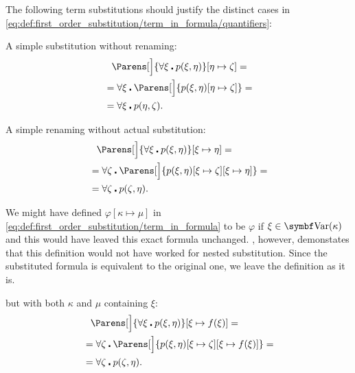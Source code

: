 \begin{example}\label{ex:first_order_substitution}
  The following term substitutions should justify the distinct cases in \eqref{eq:def:first_order_substitution/term_in_formula/quantifiers}:
  \begin{ExEnum}
     A simple substitution without renaming:
    \begin{align*}
      &{}\phantom{=}{}
      \Parens[\Big]{\forall \xi \centerdot p(\xi, \eta)}[\eta \mapsto \zeta]
      = \\ &=
      \forall \xi \centerdot \Parens[\Big]{p(\xi, \eta)[\eta \mapsto \zeta]}
      = \\ &=
      \forall \xi \centerdot p(\eta, \zeta).
    \end{align*}

     A simple renaming without actual substitution:
    \begin{align*}
      &{}\phantom{=}{}
      \Parens[\Big]{\forall \xi \centerdot p(\xi, \eta)}[\xi \mapsto \eta]
      = \\ &=
      \forall \zeta \centerdot \Parens[\Big]{p(\xi, \eta)[\xi \mapsto \zeta][\xi \mapsto \eta]}
      = \\ &=
      \forall \zeta \centerdot p(\zeta, \eta).
    \end{align*}

    We might have defined \( \varphi[\kappa \mapsto \mu] \) in \eqref{eq:def:first_order_substitution/term_in_formula} to be \( \varphi \) if \( \xi \in \Bold{Var}(\kappa) \) and this would have leaved this exact formula unchanged. , however, demonstates that this definition would not have worked for nested substitution. Since the substituted formula is equivalent to the original one, we leave the definition as it is.

      but with both \( \kappa \) and \( \mu \) containing \( \xi \):
    \begin{align*}
      &{}\phantom{=}{}
      \Parens[\Big]{\forall \xi \centerdot p(\xi, \eta)}[\xi \mapsto f(\xi)]
      = \\ &=
      \forall \zeta \centerdot \Parens[\Big]{p(\xi, \eta)[\xi \mapsto \zeta][\xi \mapsto f(\xi)]}
      = \\ &=
      \forall \zeta \centerdot p(\zeta, \eta).
    \end{align*}


\end{ExEnum}
\end{example}
